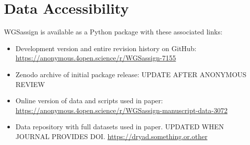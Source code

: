 \section*{Data Accessibility}

{\sc WGSassign} is available as a Python package with these associated links:
\begin{itemize}
\item Development version and entire revision history on GitHub: \url{https://anonymous.4open.science/r/WGSassign-7155}
\item Zenodo archive of initial package release: UPDATE AFTER ANONYMOUS REVIEW
\item Online version of data and scripts used in paper: \url{https://anonymous.4open.science/r/WGSassign-manuscript-data-3072}
\item Data repository with full datasets used in paper. UPDATED WHEN JOURNAL PROVIDES DOI. \url{https://dryad.something.or.other}
\end{itemize}
\mbox{}

